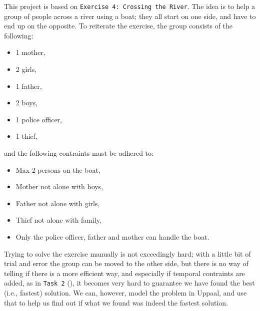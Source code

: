 This project is based on \texttt{Exercise 4: Crossing the River}. The idea is to help a group of people across a river using a boat; they all start on one side, and have to end up on the opposite. To reiterate the exercise, the group consists of the following:
\begin{itemize}
\setlength\itemsep{.1em}
	\item 1 mother,
	\item 2 girls,
	\item 1 father,
	\item 2 boys,
	\item 1 police officer,
	\item 1 thief,
\end{itemize}

\noindent and the following contraints must be adhered to:

\begin{itemize}
\setlength\itemsep{.1em}
	\item Max 2 persons on the boat,
	\item Mother not alone with boys,
	\item Father not alone with girls,
	\item Thief not alone with family,
	\item Only the police officer, father and mother can handle the boat.
\end{itemize}

\noindent Trying to solve the exercise manually is not exceedingly hard; with a little bit of trial and error the group can be moved to the other side, but there is no way of telling if there is a more efficient way, and especially if temporal contraints are added, as in \texttt{Task 2} (), it becomes very hard to guarantee we have found the best (i.e., fastest) solution. We can, however, model the problem in Uppaal, and use that to help us find out if what we found was indeed the fastest solution.